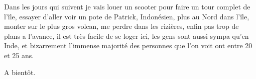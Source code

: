 \begin{multicols}{2}
Dans les jours qui suivent je vais louer un scooter pour faire un tour complet de l'île, essayer d'aller voir un pote de Patrick, Indonésien, plus au Nord dans l'île, monter sur le plus gros volcan, me perdre dans les rizières, enfin pas trop de plans a l'avance, il est très facile de se loger ici, les gens sont aussi sympa qu'en Inde, et bizarrement l'immense majorité des personnes que l'on voit ont entre 20 et 25 ans.

A bientôt.

\end{multicols}


